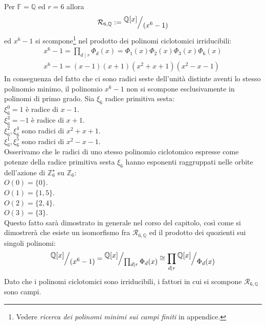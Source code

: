 \begin{esempio}
   Per $\mathbb{F} = \mathbb{Q}$ ed $r = 6$ allora
   \begin{align*}
      \mathcal{R}_{6, \mathbb{Q}} 
       := \quotient{\mathbb{Q} \lbrack x \rbrack  }{(x^{6} - 1)} 
   \end{align*}
  ed $x^{6}-1$ si scompone\footnote{Vedere \emph{ricerca dei polinomi minimi sui campi finiti} in appendice.} nel prodotto dei polinomi ciclotomici irriducibili:
\begin{align*}
  x^{6} - 1 =   \prod_{d \mid r} \Phi_{d}(x) =
  \Phi_{1}(x)\Phi_{2}(x)\Phi_{3}(x)\Phi_{6}(x) \\
  x^{6} - 1 = (x-1)(x+1)(x^2+x+1)(x^2-x-1)
\end{align*}
In conseguenza del fatto che ci sono radici seste dell'unità
distinte aventi lo stesso polinomio minimo,  il polinomio $x^{6} - 1$ non si
scompone esclusivamente in polinomi di primo grado. Sia $\xi_{6}$ radice
primitiva sesta:\\
$\xi_{6}^{0} = 1$ è radice di $x-1$.\\
$\xi_{6}^{3} = -1$ è radice di $x + 1$.\\
$\xi_{6}^{2}, \xi_{6}^{4} $ sono radici di $x^2+x+1$.\\
$\xi_{6}^{1}, \xi_{6}^{5}$ sono radici di $x^2-x-1$.\\
Osserivamo che le radici di uno stesso polinomio ciclotomico espresse come potenze della radice primitiva sesta $\xi_{6}$ hanno esponenti raggruppati nelle orbite dell'azione di
$\mathbb{Z}_{6}^{\star}$ su $\mathbb{Z}_{6}$: \\
$O(0)= \lbrace 0 \rbrace$.\\
$O(1)= \lbrace 1,5 \rbrace$.\\
$O(2)= \lbrace 2,4 \rbrace$.\\
$O(3)= \lbrace 3 \rbrace$.\\
Questo fatto sarà dimostrato in generale nel corso del capitolo, così come si
dimostrerà che esiste un isomorfismo fra
$\mathcal{R}_{6, \mathbb{Q}} $ ed il prodotto dei quozienti sui singoli
polinomi:
\begin{align*}
\quotient{\mathbb{Q} \lbrack x \rbrack  }{(x^{6} - 1)} =
\quotient{\mathbb{Q} \lbrack x \rbrack  }{ \prod_{d\mid r} \Phi_{d}(x)} \cong
\prod_{d\mid r} \quotient{\mathbb{Q} \lbrack x \rbrack  }{\Phi_{d}(x)}
\end{align*}
Dato che i polinomi ciclotomici sono irriducibili, i fattori in cui si scompone
$ \mathcal{R}_{6, \mathbb{Q}} $ sono campi.
\end{esempio}

